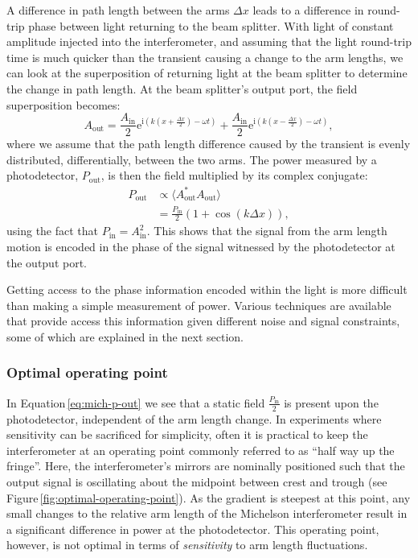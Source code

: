 A difference in path length between the arms $\Delta x$ leads to a difference in round-trip phase between light returning to the beam splitter. With light of constant amplitude injected into the interferometer, and assuming that the light round-trip time is much quicker than the transient causing a change to the arm lengths, we can look at the superposition of returning light at the beam splitter to determine the change in path length. At the beam splitter's output port, the field superposition becomes:
\begin{equation}
  A_{\text{out}} = \frac{A_{\text{in}}}{2} \text{e}^{\text{i} \left( k \left( x + \frac{\Delta x}{2} \right) - \omega t \right)} + \frac{A_{\text{in}}}{2} \text{e}^{\text{i} \left( k \left( x - \frac{\Delta x}{2} \right) - \omega t \right)},
\end{equation}
where we assume that the path length difference caused by the transient is evenly distributed, differentially, between the two arms. The power measured by a photodetector, $P_{\text{out}}$, is then the field multiplied by its complex conjugate:
\begin{equation}
  \label{eq:mich-p-out}
  \begin{split}
    P_{\text{out}} &\propto \langle A_{\text{out}}^*A_{\text{out}} \rangle \\
                   &= \frac{P_{\text{in}}}{2} \left( 1 + \cos \left( k \Delta x \right) \right),
  \end{split}
\end{equation}
using the fact that $P_{\text{in}} = A_{\text{in}}^2$. This shows that the signal from the arm length motion is encoded in the phase of the signal witnessed by the photodetector at the output port.

Getting access to the phase information encoded within the light is more difficult than making a simple measurement of power. Various techniques are available that provide access this information given different noise and signal constraints, some of which are explained in the next section.

\subsubsection{Optimal operating point}
In Equation\,\ref{eq:mich-p-out} we see that a static field $\frac{P_{\text{in}}}{2}$ is present upon the photodetector, independent of the arm length change. In experiments where sensitivity can be sacrificed for simplicity, often it is practical to keep the interferometer at an operating point commonly referred to as ``half way up the fringe''. Here, the interferometer's mirrors are nominally positioned such that the output signal is oscillating about the midpoint between crest and trough (see Figure\,\ref{fig:optimal-operating-point}). As the gradient is steepest at this point, any small changes to the relative arm length of the Michelson interferometer result in a significant difference in power at the photodetector. This operating point, however, is not optimal in terms of \emph{sensitivity} to arm length fluctuations.

